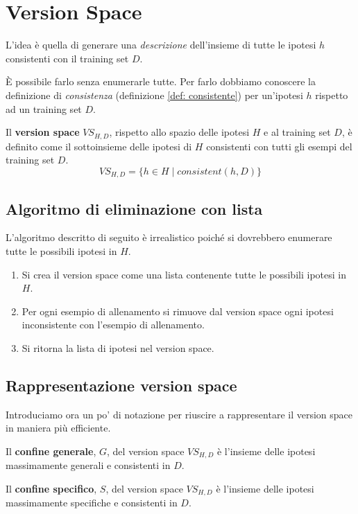 \section{Version Space}
L'idea \`e quella di generare una \emph{descrizione} dell'insieme di tutte le ipotesi $h$ consistenti con il training
set $D$.

\`E possibile farlo senza enumerarle tutte. Per farlo dobbiamo conoscere la definizione di \emph{consistenza} (definizione
\ref{def: consistente}) per un'ipotesi $h$ rispetto ad un training set $D$.

\begin{definition}
	Il \textbf{version space} $VS_{H, D}$, rispetto allo spazio delle ipotesi $H$ e al training set $D$, \`e definito
	come il sottoinsieme delle ipotesi di $H$ consistenti con tutti gli esempi del training set $D$.
	\[ VS_{H, D} = \{ h \in H \mid consistent(h, D) \} \]
\end{definition}

\subsection{Algoritmo di eliminazione con lista}
L'algoritmo descritto di seguito \`e irrealistico poich\'e si dovrebbero enumerare tutte le possibili ipotesi in $H$.
\begin{enumerate}
	\item Si crea il version space come una lista contenente tutte le possibili ipotesi in $H$.
	\item Per ogni esempio di allenamento si rimuove dal version space ogni ipotesi inconsistente con l'esempio
	      di allenamento.
	\item Si ritorna la lista di ipotesi nel version space.
\end{enumerate}

\subsection{Rappresentazione version space}
Introduciamo ora un po' di notazione per riuscire a rappresentare il version space in maniera pi\`u efficiente.

\begin{definition}
	Il \textbf{confine generale}, $G$, del version space $VS_{H, D}$ \`e l'insieme delle ipotesi massimamente generali
	e consistenti in $D$.
\end{definition}

\begin{definition}
	Il \textbf{confine specifico}, $S$, del version space $VS_{H, D}$ \`e l'insieme delle ipotesi massimamente specifiche
	e consistenti in $D$.
\end{definition}

